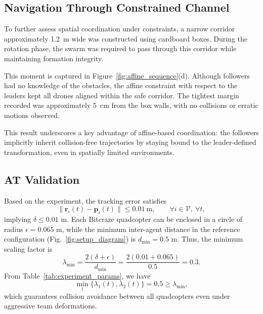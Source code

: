 \documentclass[journal]{IEEEtran}
\theoremstyle{definition}
\theoremstyle{plain}
\begin{document}
\subsection{Navigation Through Constrained Channel}

To further assess spatial coordination under constraints, a narrow corridor approximately 1.2~m wide was constructed using cardboard boxes. During the rotation phase, the swarm was required to pass through this corridor while maintaining formation integrity.

This moment is captured in Figure~\ref{fig:affine_sequence}(d). Although followers had no knowledge of the obstacles, the affine constraint with respect to the leaders kept all drones aligned within the safe corridor. The tightest margin recorded was approximately 5~cm from the box walls, with no collisions or erratic motions observed.

This result underscores a key advantage of affine-based coordination: the followers implicitly inherit collision-free trajectories by staying bound to the leader-defined transformation, even in spatially limited environments.

\subsection{AT Validation}
Based on the experiment, the tracking error satisfies 
\[
\|\mathbf{r}_i(t)-\mathbf{p}_i(t)\|\leq 0.01~\text{m}, \qquad \forall i\in \mathcal{V},~\forall t,
\]
implying $\delta \leq 0.01$ m. Each Bitcraze quadcopter can be enclosed in a circle of radius $\epsilon=0.065$ m, while the minimum inter-agent distance in the reference configuration (Fig.~\ref{fig:setup_diagram}) is $d_{\min}=0.5$ m. Thus, the minimum scaling factor is
\[
\lambda_{\min}=\frac{2(\delta+\epsilon)}{d_{\min}}
=\frac{2(0.01+0.065)}{0.5}=0.3.
\]
From Table~\ref{tab:experiment_params}, we have 
\[
\min_t\{\lambda_1(t),\lambda_2(t)\}=0.5 \geq \lambda_{\min},
\]
which guarantees collision avoidance between all quadcopters even under aggressive team deformations.
\end{document}
